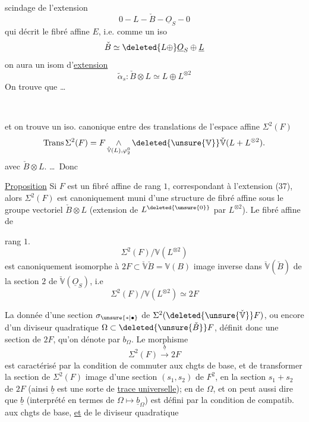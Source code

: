 scindage de  l'extension
\[
0\mathbin{-}L\mathbin{-}\check B\mathbin{-}\underline O_S\mathbin{-}0 \tag*{(37)}
\]
qui décrit le fibré affine $E$, i.e. comme
un iso
\[
\check B\simeq\deleted{L\oplus}\underline O_S\oplus\underline{L}
\]
on aura un isom d'\uline{extension}
\[
\widetilde\alpha_s:\check B\otimes L\simeq L\oplus L^{\otimes2} \tag*{(38)}
\]
On trouve que \ldots

\noindent\textemdash\ \textemdash\ \textemdash

et on  trouve un iso. canonique
entre  des translations de l'espace
affine $\Sigma^2(F)$ 
\[
\operatorname{Trans}\Sigma^2(F)=F\mathop{\wedge}_{\check{\mathbb V}(L),\varphi_2^0}
\deleted{\unsure{\mathbb V}}\check{\mathbb V}(L+L^{\otimes2}).
\]
avec $\check B\otimes L$. \ldots\ Donc

\uline{Proposition}  Si $F$ est un fibré affine
de rang $1$,  correspondant à l'extension
\unsure{(3\ldots{}|(30\ldots{}} (37), alors $\Sigma^2(F)$ est canoniquement
muni d'une structure de fibré affine
sous le groupe vectoriel $\check B\otimes L$ (extension de
$L^{\deleted{\unsure{0}}}$ par $L^{\otimes2}$). Le fibré  affine de


rang $1$.
\[
\Sigma^2(F)/\mathbb V(L^{\otimes2})
\]
est canoniquement isomorphe à $2F\subset\check{\mathbb V}\check B=\mathbb V(B)$
image inverse dans $\check{\mathbb V}(\check B)$ de la section $2$
de $\check{\mathbb V}(\underline O_S)$, i.e
\[
\Sigma^2(F)/\mathbb V(L^{\otimes2})\simeq 2F \tag*{(39)}
\]

 La donnée d'une section $\sigma_{\unsure{*|\bullet}}$ de
$\Sigma^2(\deleted{\unsure{\check{\mathbb V}}}F)$, ou encore d'un diviseur quadratique
$\Omega\subset\deleted{\unsure{\check B}}F$,  définit donc une section de
$2F$, qu'on  dénote par
$b_\Omega$.  Le morphisme
\[
\Sigma^2(F)\xrightarrow{\underline b}2F \tag*{(40)}
\]
est caractérisé par la condition de commuter
aux chgts de base, et de transformer
la section de $\Sigma^2(F)$ image d'une section
$(s_1,s_2)$ de $F^2$, en la section $s_1+s_2$ de $2F$
(ainsi $\underline b$ est une sorte de \uline{trace universelle});
en  de $\Omega$, et on peut aussi dire
que $\underline b$ (interprété en termes de
$\Omega\longmapsto \underline b_\Omega$) est défini par la condition de
compatib. aux chgts de base, \uline{et}  de
 le  diviseur quadratique

